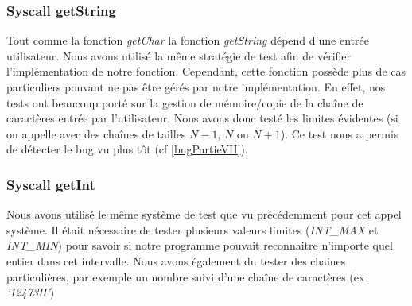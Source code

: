 \documentclass{article}
\begin{document}
\subsubsection{Syscall getString}
Tout comme la fonction \textit{getChar} la fonction \textit{getString} dépend
d'une entrée utilisateur. Nous avons utilisé la même stratégie de test afin de
vérifier l'implémentation de notre fonction. Cependant, cette fonction possède
plus de cas particuliers pouvant ne pas être gérés par notre implémentation. En
effet, nos tests ont beaucoup porté sur la gestion de mémoire/copie de la
chaîne de caractères entrée par l'utilisateur. Nous avons donc testé les
limites évidentes (si on appelle avec des chaînes de tailles $N-1$, $N$ ou
$N+1$). Ce test nous a permis de détecter le bug vu plus tôt (cf
\ref{bugPartieVII}).
\subsubsection{Syscall getInt}
Nous avons utilisé le même système de test que vu précédemment pour cet appel système.
Il était nécessaire de tester plusieurs valeurs limites (\textit{INT\_MAX} et \textit{INT\_MIN}) pour
savoir si notre programme pouvait reconnaitre n'importe quel entier dans cet intervalle. Nous avons également
du tester des chaines particulières, par exemple un nombre suivi d'une chaîne de caractères (ex \textit{'12473H'})
\end{document}
